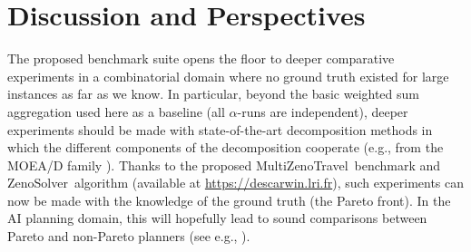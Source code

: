 \documentclass{llncs}
\def\MULTIZENO{{\sc MultiZenoTravel}}
\def\ZENOSOLVER{{\sc ZenoSolver}}
\begin{document}

%       

\section{Discussion and Perspectives}
\label{sec:conclusion}
The proposed benchmark suite opens the floor to deeper comparative experiments in a combinatorial domain where no ground truth existed for large instances as far as we know.
In particular, beyond the basic weighted sum aggregation used here as a baseline (all $\alpha$-runs are independent), deeper experiments should be made with state-of-the-art decomposition methods in which the different components of the decomposition cooperate (e.g., from the MOEA/D family \cite{Zhang-MOEAD-TEC07}). Thanks to the proposed \MULTIZENO\ benchmark and \ZENOSOLVER\  algorithm (available at \url{https://descarwin.lri.fr}), such experiments can now be made with the knowledge of the ground truth (the Pareto front). In the AI planning domain, this will hopefully lead to sound comparisons between Pareto and non-Pareto planners (see e.g., \cite{LPG-STAIRS2012}).

%
%


%
\end{document}
